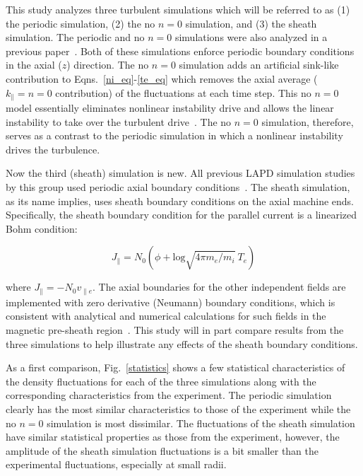\documentclass[showpacs,preprintnumbers,amsmath,amssymb,superscriptaddress,aip]{revtex4-1}
\def\beq{\begin{equation}}
\def\eeq{\end{equation}}
\def\para{\parallel}
\newcommand{\vpe}{v_{\parallel e}}
\begin{document}
This study analyzes three turbulent simulations which will be referred to as (1) the periodic simulation, (2) the no $n=0$ simulation, and (3) the sheath simulation.
The periodic and no $n=0$ simulations were also analyzed in a previous paper~\cite{friedman2012b}. Both of these simulations enforce periodic boundary conditions in the axial ($z$)
direction. The no $n=0$ simulation adds an artificial sink-like contribution to Eqns.~\ref{ni_eq}-\ref{te_eq} which removes the axial average 
($k_\parallel = n = 0$ contribution) of the fluctuations at each time step. This no $n=0$ model essentially eliminates nonlinear instability drive and allows
the linear instability to take over the turbulent drive~\cite{friedman2012b}. The no $n=0$ simulation, therefore, serves as a contrast to the periodic simulation in which a nonlinear instability
drives the turbulence.

Now the third (sheath) simulation is new. 
All previous LAPD simulation studies by this group used periodic axial boundary conditions~\cite{Popovich2010a,Popovich2010b,Umansky2011,friedman2012,friedman2012b}.
The sheath simulation, as its name implies, uses sheath boundary conditions on the axial machine ends. Specifically, the sheath boundary
condition for the parallel current is a linearized Bohm condition:

\beq
\label{sheath_bndry}
J_\para = N_0 (\phi + \text{log} \sqrt{4 \pi m_e/m_i} \ T_e) 
\eeq

where $J_\para = - N_0 \vpe$. The axial boundaries for the other independent fields are implemented with zero derivative (Neumann) boundary conditions, which is consistent with
analytical and numerical calculations for such fields in the magnetic pre-sheath region~\cite{loizu2012}. 
This study will in part compare results from the three simulations to help illustrate any effects of the sheath boundary conditions.

As a first comparison, Fig.~\ref{statistics} shows a few statistical characteristics of the density fluctuations for each of the three simulations along with the corresponding
characteristics from the experiment. The periodic simulation clearly has the most similar characteristics to those of the experiment while the no $n=0$ simulation is most dissimilar.
The fluctuations of the sheath simulation have similar statistical properties as those from the experiment, however, 
the amplitude of the sheath simulation fluctuations is a bit smaller than the experimental fluctuations, especially at small radii.
\end{document}
